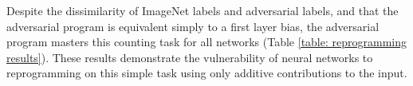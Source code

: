 \documentclass{article}
\begin{document}
Despite the dissimilarity of ImageNet labels and adversarial labels, and that the adversarial program is equivalent simply to a first layer bias, the adversarial program masters this counting task for all networks (Table \ref{table: reprogramming results}). 
These results demonstrate the vulnerability of neural networks to reprogramming on this simple task using only additive contributions to the input.
\end{document}
